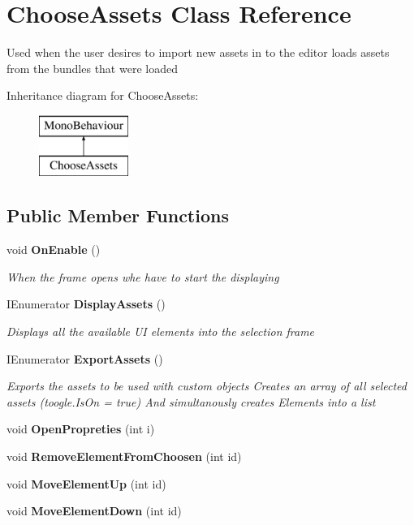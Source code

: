 \section{Choose\+Assets Class Reference}
\label{class_choose_assets}


Used when the user desires to import new assets in to the editor loads assets from the bundles that were loaded  


Inheritance diagram for Choose\+Assets\+:\begin{figure}[H]
\begin{center}
\leavevmode
\includegraphics[height=2.000000cm]{class_choose_assets}
\end{center}
\end{figure}
\subsection*{Public Member Functions}
\begin{DoxyCompactItemize}
\item 
void \textbf{ On\+Enable} ()
\begin{DoxyCompactList}\small\item\em When the frame opens whe have to start the displaying \end{DoxyCompactList}\item 
I\+Enumerator \textbf{ Display\+Assets} ()
\begin{DoxyCompactList}\small\item\em Displays all the available UI elements into the selection frame \end{DoxyCompactList}\item 
I\+Enumerator \textbf{ Export\+Assets} ()
\begin{DoxyCompactList}\small\item\em Exports the assets to be used with custom objects Creates an array of all selected assets (toogle.\+Is\+On = true) And simultanously creates Elements into a list \end{DoxyCompactList}\item 
void \textbf{ Open\+Propreties} (int i)
\item 
void \textbf{ Remove\+Element\+From\+Choosen} (int id)
\item 
void \textbf{ Move\+Element\+Up} (int id)
\item 
void \textbf{ Move\+Element\+Down} (int id)
\end{DoxyCompactItemize}
